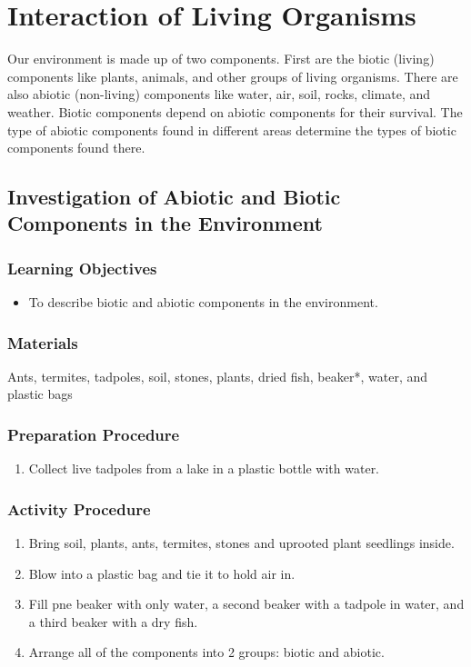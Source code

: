 \section{Interaction of Living Organisms}
Our environment is made up of two components. First are the biotic (living) components like plants, animals, and other groups of living organisms. There are also abiotic (non-living) components like water, air, soil, rocks, climate, and weather. Biotic components depend on abiotic components for their survival. The type of abiotic components found in different areas determine the types of biotic components found there.

\subsection{Investigation of Abiotic and Biotic Components in the Environment}

\subsubsection*{Learning Objectives}
\begin{itemize}
\item{To describe biotic and abiotic components in the environment.}
\end{itemize}

\subsubsection*{Materials}
Ants, termites, tadpoles, soil, stones, plants, dried fish, beaker*, water, and plastic bags

\subsubsection*{Preparation Procedure}
\begin{enumerate}
\item{Collect live tadpoles from a lake in a plastic bottle with water.}
\end{enumerate}

\subsubsection*{Activity Procedure}
\begin{enumerate}
\item{Bring soil, plants, ants, termites, stones and uprooted plant seedlings inside.}
\item{Blow into a plastic bag and tie it to hold air in.}
\item{Fill pne beaker with only water, a second beaker with a tadpole in water, and a third beaker with a dry fish.}
\item{Arrange all of the components into 2 groups: biotic and abiotic.}
\end{enumerate}

